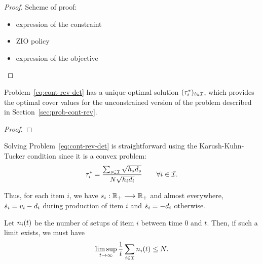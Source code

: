 \begin{proof}
Scheme of proof:
\begin{itemize}
  \item expression of the constraint
  \item ZIO policy
  \item expression of the objective
\end{itemize}
\end{proof}

\begin{prop}
Problem~\eqref{eq:cont-rev-det} has a unique optimal solution $(\tau_i^*)_{i\in\mathcal{I}}$, which provides the optimal cover values for the unconstrained version of the problem described in Section~\ref{sec:prob-cont-rev}.
\end{prop}

\begin{proof}
\tbc
\end{proof}

Solving Problem~\eqref{eq:cont-rev-det} is straightforward using the Karush-Kuhn-Tucker condition since it is a convex problem:
$$\tau_i^*= \frac{\sum_{s\in\mathcal{I}}\sqrt{h_sd_s}}{N\sqrt{h_id_i}}\qquad\forall i\in\mathcal{I}.$$






Thus, for each item $i$, we have $s_i:\mathbb{R}_+\longrightarrow\mathbb{R}_+$ and almost everywhere, $\dot{s}_i=v_i-d_i$ during production of item $i$ and $\dot{s}_i=-d_i$ otherwise.

Let $n_i\bracket{t}$ be the number of setups of item $i$ between time 0 and $t$.
Then, if such a limit exists, we must have
\begin{equation}
  \limsup_{t\rightarrow\infty}\frac{1}{t} \sum_{i\in\REF}n_i\bracket{t}\le\nbsetups.
\end{equation}



